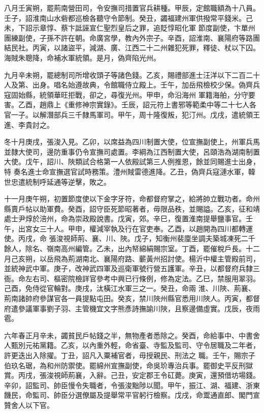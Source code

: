 \begin{pinyinscope}
 八月壬寅朔，罷荊南營田司，令安撫司措置官兵耕種。甲辰，定館職額為十八員。壬子，詔淮南山水砦都巡檢各聽守令節制。癸丑，蠲福建州軍供撥常平錢米。己未，下詔示章惇、蔡卞詆誣宣仁聖烈皇后之罪，追貶惇昭化軍
 節度副使，卞單州團練副使，子孫不許在朝。命廣宮學，教內外宗子。辛酉，詔淮南、襄陽府等路團結民社。丙寅，以諸盜平，減湖、廣、江西二十二州雜犯死罪，釋徒、杖以下囚。海賊朱聰降，命補水軍統領。是月，偽齊陷光州。



 九月辛未朔，罷總制司所增收頭子等諸色錢。乙亥，賜禮部進士汪洋以下二百二十人及第、出身。唱名始遵故典，令館職侍立殿上。壬午，加岳飛檢校少保。偽齊兵寇固始縣，統領華旺拒戰，卻之，尋復光州。甲申，命沿海州
 軍籍海舶，分守要害。乙酉，趙鼎上《重修神宗實錄》。壬辰，詔元符上書邪等範柔中等二十七人各官一子。以解潛部兵三千隸馬軍司。甲午，周十隆復叛，犯汀州。戊戌，遣統領王進、李貴討之。



 冬十月庚戌，張浚入見。乙卯，以席益為四川制置大使，位宣撫副使上，州軍兵馬並隸大使司，邊防重事仍令宣撫司處置。李綱為江西制置大使，呂頤浩為湖南制置大使。戊午，詔川、陜類試合格第一人依殿試第三人例推恩，餘並同賜進士出身，特
 奏名進士命宣撫選官試時務策。澧州賊雷德進降。乙丑，偽齊兵寇漣水軍，韓世忠遣統制呼延通等逆擊，敗之。



 十一月庚午朔，初置節度使以下金字牙符，命都督府掌之，給將帥立戰功者。命州縣賣戶帖以助軍費。癸酉，詔守臣死節昭著者，毋限品秩，並賜謚。乙亥，征和靖處士尹焞於涪州，命為崇政殿說書。戊寅，郊。辛巳，復置淮南提舉鹽事官。壬午，出宮女三十人。甲申，權減宰執及行在官吏奉。乙酉，以趙開為四川都轉運使。丙戌，命
 張浚視師荊、襄、川、陜。戊子，知衡州裴廩坐調夫築城凍死二千餘人，除名、嶺南高州編管。乙未，出內帑綿絹賜宗室。丁酉，罷催稅戶長。十二月己亥朔，以岳飛為荊湖南北、襄陽府路、蘄黃州招討使。楊沂中權主管殿前司，並統神武中軍。庚子，改神武四軍及巡衛軍號行營五護軍。辛丑，以都督府兵隸三衙。命左右司、樞密院檢詳官參考中興已行條例，修為定法。乙巳，禁服用翠羽。己酉，免侍從官輪對。庚戌，汰橫江水軍三之一。癸丑，命兩
 淮、川陜、荊襄、荊南諸帥府參謀官各一員提點屯田。癸亥，禁川陜州縣官悉用川陜人。丙寅，都督府遣參議軍事劉子羽、主管機宜文字熊彥詩撫諭川陜，且察邊備虛實。戊辰，夜雨雹。



 六年春正月辛未，蠲貧民戶帖錢之半，無物產者悉除之。癸酉，命給事中、中書舍人甄別元祐黨籍。乙亥，以內重外輕，命省臺、寺監及監司、守令居職及二年者，許更迭出入除擢。丁丑，詔凡入粟補官者，毋授親民、刑法之
 職。壬午，賜宗子伯玖名琚，為和州防禦使。罷綿州宣撫副使，命吳玠專治兵事。罷御史平反刑獄賞。丙戌，張浚視師荊襄，入辭。己丑，安定郡王令矼薨。庚寅，還預借坊場錢。辛卯，詔監司、帥臣慢令失職者，令張浚黜陟以聞。甲午，振江、湖、福建、浙東饑民，命監司、帥臣分選僚屬及提舉常平官躬行檢察。戊戌，命鬻通直郎、閣門宣贊舍人以下官。




\end{pinyinscope}
